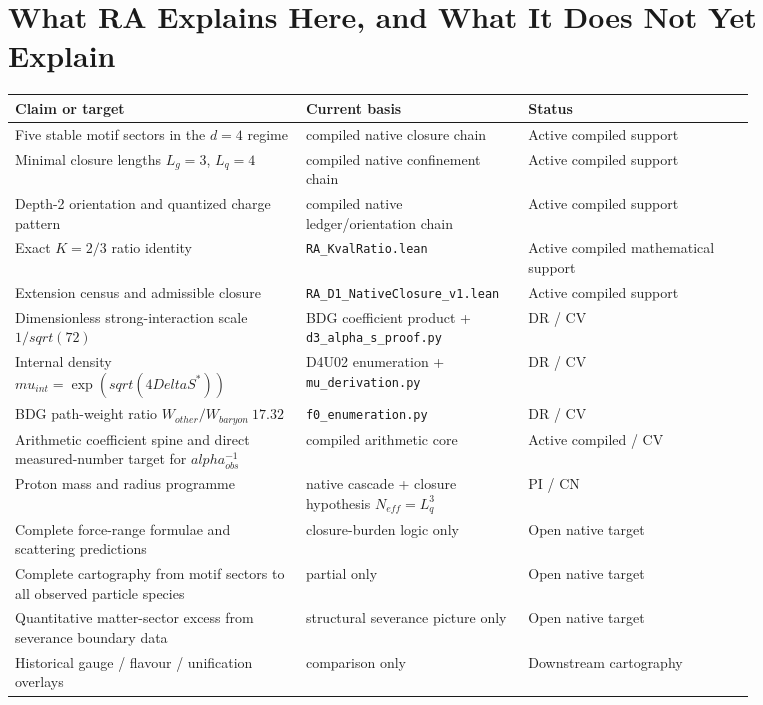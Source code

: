 \documentclass[11pt]{article}
\def\Delta{Delta}%
\def\mu{mu}%
\def\alpha{alpha}%
\def\mathrm#1{#1}%
\def\sqrt#1{sqrt(#1)}%
\def\approx{~}%
\begin{document}
\section{What RA Explains Here, and What It Does Not Yet Explain}

\begin{center}
\small
\begin{longtable}{p{0.36\linewidth}p{0.22\linewidth}p{0.28\linewidth}}
\toprule
Claim or target & Current basis & Status \\
\midrule
Five stable motif sectors in the $d=4$ regime & compiled native closure chain & Active compiled support \\
Minimal closure lengths $L_g=3$, $L_q=4$ & compiled native confinement chain & Active compiled support \\
Depth-2 orientation and quantized charge pattern & compiled native ledger/orientation chain & Active compiled support \\
Exact $K=2/3$ ratio identity & \texttt{RA\_KvalRatio.lean} & Active compiled mathematical support \\
Extension census and admissible closure & \texttt{RA\_D1\_NativeClosure\_v1.lean} & Active compiled support \\
Dimensionless strong-interaction scale $1/\sqrt{72}$ & BDG coefficient product + \texttt{d3\_alpha\_s\_proof.py} & DR / CV \\
Internal density $\mu_{\mathrm{int}}=\exp(\sqrt{4\Delta S^*})$ & D4U02 enumeration + \texttt{mu\_derivation.py} & DR / CV \\
BDG path-weight ratio $W_{\mathrm{other}}/W_{\mathrm{baryon}}\approx17.32$ & \texttt{f0\_enumeration.py} & DR / CV \\
Arithmetic coefficient spine and direct measured-number target for $\alpha^{-1}_{\mathrm{obs}}$ & compiled arithmetic core & Active compiled / CV \\
Proton mass and radius programme & native cascade + closure hypothesis $N_{\mathrm{eff}}=L_q^3$ & PI / CN \\
Complete force-range formulae and scattering predictions & closure-burden logic only & Open native target \\
Complete cartography from motif sectors to all observed particle species & partial only & Open native target \\
Quantitative matter-sector excess from severance boundary data & structural severance picture only & Open native target \\
Historical gauge / flavour / unification overlays & comparison only & Downstream cartography \\
\bottomrule
\end{longtable}
\end{center}
\end{document}
